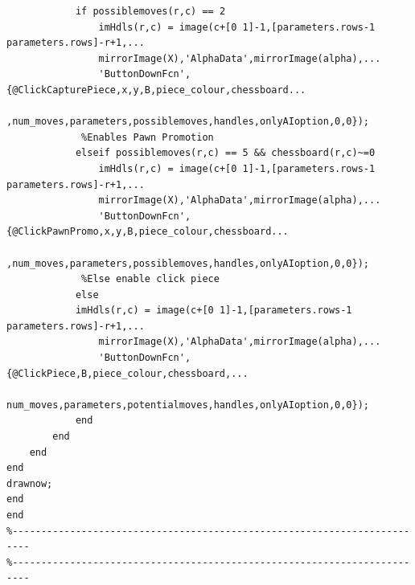\documentclass[11pt,a4paper]{article}
\begin{document}
\begin{lstlisting}
            if possiblemoves(r,c) == 2
                imHdls(r,c) = image(c+[0 1]-1,[parameters.rows-1 parameters.rows]-r+1,...
                mirrorImage(X),'AlphaData',mirrorImage(alpha),...
                'ButtonDownFcn',{@ClickCapturePiece,x,y,B,piece_colour,chessboard...
                 ,num_moves,parameters,possiblemoves,handles,onlyAIoption,0,0});
             %Enables Pawn Promotion
            elseif possiblemoves(r,c) == 5 && chessboard(r,c)~=0
                imHdls(r,c) = image(c+[0 1]-1,[parameters.rows-1 parameters.rows]-r+1,...
                mirrorImage(X),'AlphaData',mirrorImage(alpha),...
                'ButtonDownFcn',{@ClickPawnPromo,x,y,B,piece_colour,chessboard...
                 ,num_moves,parameters,possiblemoves,handles,onlyAIoption,0,0});
             %Else enable click piece
            else
            imHdls(r,c) = image(c+[0 1]-1,[parameters.rows-1 parameters.rows]-r+1,...
                mirrorImage(X),'AlphaData',mirrorImage(alpha),...
                'ButtonDownFcn',{@ClickPiece,B,piece_colour,chessboard,...
                num_moves,parameters,potentialmoves,handles,onlyAIoption,0,0});
            end
        end
    end
end
drawnow;
end
end
%-------------------------------------------------------------------------
%-------------------------------------------------------------------------

\end{lstlisting}
\end{document}
